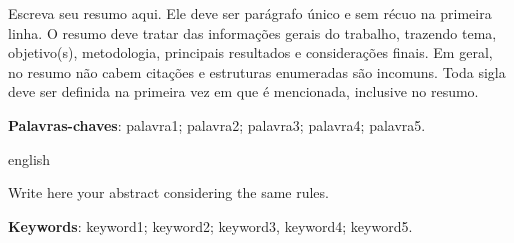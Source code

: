 \setlength{\absparsep}{18pt} %
\begin{resumo}

Escreva seu resumo aqui. Ele deve ser parágrafo único e sem récuo na primeira linha. O resumo deve tratar das informações gerais do trabalho, trazendo tema, objetivo(s), metodologia, principais resultados e considerações finais. Em geral, no resumo não cabem citações e estruturas enumeradas são incomuns. Toda sigla deve ser definida na primeira vez em que é mencionada, inclusive no resumo.
 
 
 \noindent
 \textbf{Palavras-chaves}: palavra1; palavra2; palavra3; palavra4; palavra5.
\end{resumo}
\begin{resumo}[Abstract]
	\begin{otherlanguage*}{english}
	
	Write here your abstract considering the same rules.
	\lipsum[1-1]
	
	\vspace{\onelineskip}
	\noindent 
	\textbf{Keywords}: keyword1; keyword2; keyword3, keyword4; keyword5.
	\end{otherlanguage*}
\end{resumo}